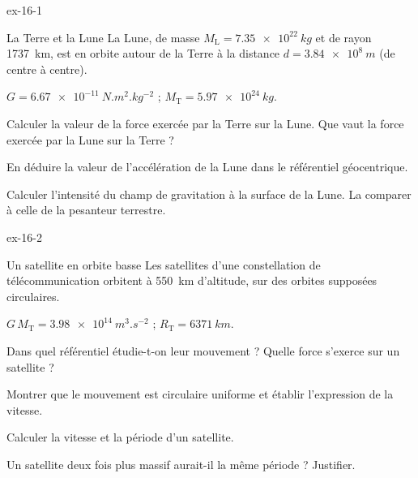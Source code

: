 \begin{blocLivre}{ex-16-1}
\begin{exercice}[1]{La Terre et la Lune}
La Lune, de masse $M_\mathrm{L}=\qty{7,35e22}{kg}$ et de rayon \qty{1737}{km}, est en orbite autour de la Terre à la distance
$d=\qty{3,84e8}{m}$ (de centre à centre).
\begin{donnees}
$G=\qty{6,67e-11}{N.m^2.kg^{-2}}$ ; $M_\mathrm{T}=\qty{5,97e24}{kg}$.
\end{donnees}
\begin{questions}
\item Calculer la valeur de la force exercée par la Terre sur la Lune. Que vaut la force exercée par la Lune sur la Terre ?
\item En déduire la valeur de l'accélération de la Lune dans le référentiel géocentrique.
\item Calculer l'intensité du champ de gravitation à la surface de la Lune. La comparer à celle de la pesanteur terrestre.
\end{questions}
\end{exercice}
\end{blocLivre}
\begin{blocLivre}{ex-16-2}
\begin{exercice}[1]{Un satellite en orbite basse}
Les satellites d'une constellation de télécommunication orbitent à 550~km d'altitude, sur des orbites supposées
circulaires.
\begin{donnees}
$G\,M_\mathrm{T}=\qty{3,98e14}{m^3.s^{-2}}$ ; $R_\mathrm{T}=\qty{6371}{km}$.
\end{donnees}
\begin{questions}
\item Dans quel référentiel étudie-t-on leur mouvement ? Quelle force s'exerce sur un satellite ?
\item Montrer que le mouvement est circulaire uniforme et établir l'expression de la vitesse.
\item Calculer la vitesse et la période d'un satellite.
\item Un satellite deux fois plus massif aurait-il la même période ? Justifier.
\end{questions}
\end{exercice}
\end{blocLivre}
